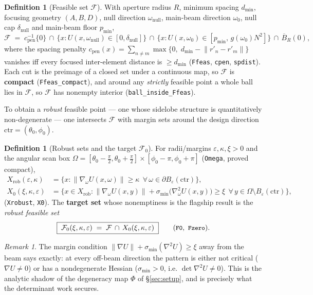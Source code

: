 \documentclass[11pt]{article}
\theoremstyle{plain}
\theoremstyle{definition}
\newtheorem{definition}[theorem]{Definition}
\theoremstyle{remark}
\newtheorem{remark}[theorem]{Remark}
\newcommand{\Upat}{U}                 %
\newcommand{\gain}{g}                 %
\newcommand{\Ffeas}{\mathcal{F}}      %
\newcommand{\Fzero}{\mathcal{F}_{0}}  %
\newcommand{\Xrob}{X_{\mathrm{rob}}}
\newcommand{\Xnull}{X_{0}}
\newcommand{\grad}{\nabla}
\newcommand{\sigmin}{\sigma_{\min}}
\newcommand{\code}[1]{\texttt{\small #1}}
\newcommand{\norm}[1]{\lVert #1 \rVert}
\begin{document}
\begin{definition}[Feasible set $\Ffeas$]\label{def:feas}
With aperture radius $R$, minimum spacing $d_{\min}$, focusing geometry
$(A,B,D)$, null direction $\omega_{\mathrm{null}}$, main-beam direction
$\omega_0$, null cap $\delta_{\mathrm{null}}$ and main-beam floor $p_{\min}$,
\[
  \Ffeas \;=\; c_{\mathrm{pen}}^{-1}\{0\}
   \,\cap\, \{x:\Upat(x,\omega_{\mathrm{null}})\in[0,\delta_{\mathrm{null}}]\}
   \,\cap\, \{x:\Upat(x,\omega_0)\in[p_{\min},\,\gain(\omega_0)N^2]\}
   \,\cap\, \overline{B}_R(0),
\]
where the spacing penalty
$c_{\mathrm{pen}}(x)=\sum_{n\ne m}\max\{0,\;d_{\min}-\norm{r'_n-r'_m}\}$ vanishes
iff every focused inter-element distance is $\ge d_{\min}$ (\code{Ffeas},
\code{cpen}, \code{spdist}).  Each cut is the preimage of a closed set under a
continuous map, so $\Ffeas$ is \textbf{compact} (\code{Ffeas\_compact}), and
around any \emph{strictly} feasible point a whole ball lies in $\Ffeas$, so
$\Ffeas$ has nonempty interior (\code{ball\_inside\_Ffeas}).
\end{definition}

To obtain a \emph{robust} feasible point --- one whose sidelobe structure is
quantitatively non-degenerate --- one intersects $\Ffeas$ with margin sets around
the design direction $\mathrm{ctr}=(\theta_0,\phi_0)$.

\begin{definition}[Robust sets and the target $\Fzero$]\label{def:F0}
For radii/margins $\varepsilon,\kappa,\xi>0$ and the angular scan box
$\Omega=[\theta_0-\tfrac\pi2,\theta_0+\tfrac\pi2]\times[\phi_0-\pi,\phi_0+\pi]$
(\code{Omega}, proved compact),
\begin{align*}
  \Xrob(\varepsilon,\kappa)
    &= \big\{x : \norm{\grad_\omega\Upat(x,\omega)}\ge\kappa
        \ \ \forall\,\omega\in\partial B_\varepsilon(\mathrm{ctr})\big\},\\[2pt]
  \Xnull(\xi,\kappa,\varepsilon)
    &= \Big\{x\in\Xrob :
        \norm{\grad_\omega\Upat(x,y)}+\sigmin\!\big(\grad^2_\omega\Upat(x,y)\big)
          \ge\xi\ \ \forall\,y\in\Omega\setminus B_\varepsilon(\mathrm{ctr})\Big\},
\end{align*}
(\code{Xrobust}, \code{X0}).  The {\bf target set} whose nonemptiness is the
flagship result is the \emph{robust feasible set}
\[
  \boxed{\;\Fzero(\xi,\kappa,\varepsilon)\;=\;\Ffeas\,\cap\,\Xnull(\xi,\kappa,\varepsilon)\;}
  \qquad(\code{F0},\ \code{Fzero}).
\]
\end{definition}

\begin{remark}
The margin condition $\norm{\grad\Upat}+\sigmin(\grad^2\Upat)\ge\xi$ away from the
beam says exactly: at every off-beam direction the pattern is either not critical
($\grad\Upat\ne0$) or has a nondegenerate Hessian ($\sigmin>0$, i.e.
$\det\grad^2\Upat\ne0$).  This is the analytic shadow of the degeneracy map
$\Phi$ of \S\ref{sec:setup}, and is precisely what the determinant work secures.
\end{remark}
\end{document}
